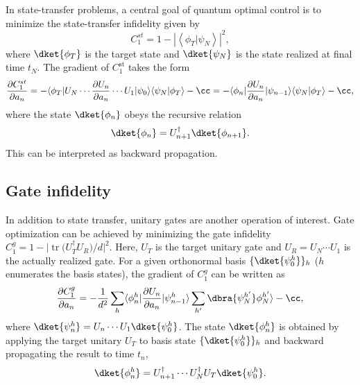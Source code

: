 In state-transfer problems, a central goal of quantum optimal control is to minimize the state-transfer infidelity given by 
\begin{equation}
\label{eq:C1st}
    C_1^{st}=1-\left|\left\langle\phi_T | \psi_{N}\right\rangle\right|^{2},
\end{equation} 
where $\dket{\phi_T}$ is the target state and $\dket{\psi_N}$ is the state realized at final time $t_N$. The gradient of $C_1^{\text{st}}$ takes the form
\begin{equation}
\label{eq:stgradient}
    \frac{\partial C_1^{st} }{\partial a_{ n}}
  =- \langle\phi_T|U_N\cdots \frac {\partial U_{n}}{\partial a_{n}}\cdots U_1|\psi_0\rangle\langle\psi_N|\phi_T\rangle -\cc
=-\langle\phi_{n}|\frac {\partial U_n }{\partial a_{n}}|\psi_{n-1}\rangle\langle\psi_N|\phi_T\rangle - \cc ,
\end{equation}
where the state $\dket{\phi_{n}}$ obeys the recursive relation
\begin{equation}
\label{eq:backward_prop}
    \dket{\phi_{n}}=U_{n+1}^\dagger\dket{\phi_{n+1}}.
\end{equation}
This can be interpreted as backward propagation.

\subsection{Gate infidelity}

In addition to state transfer, unitary gates are another operation of interest. Gate optimization can be achieved by minimizing the gate infidelity $C_1^{g}=1-\big|\operatorname{tr}\big(U_T^{\dagger} U_R\big)/d\big|^2$. Here, $U_T$ is the target unitary gate and $U_R=U_N\cdots U_1$ is the actually realized gate. For a given orthonormal basis $\{\dket{\psi^h_0}\}_h$ ($h$ enumerates the basis states), the gradient of $C_1^{ g}$ can be written as 
\begin{equation} 
\begin{aligned}
\label{eq:gategradient}
  \frac{\partial C_1^{ g} }{\partial a_{ n}}
  &=-\frac{1}{d^2}\sum_{h}\langle\phi_n^h|\frac {\partial  U_n}{\partial a_{n}}|\psi^h_{n-1}\rangle \sum_{h'}\dbra{\psi_N^{h'}}\phi_N^{h'}\rangle
  -\cc,\\
\end{aligned}
\end{equation}
where $\dket{\psi_{n}^h}=U_n\cdots U_1\dket{\psi_0^h}$. The state $\dket{\phi_{n}^h}$ is obtained by applying the target unitary $U_T$ to basis state $\{\dket{\psi^h_0}\}_h$ and backward propagating the result to time $t_n$,
\begin{equation}
\label{eq:gate_backward}
\dket{\phi_{n}^h}=U_{n+1}^\dagger \cdots U_{N}^\dagger U_T\dket{\psi_0^h}.
\end{equation}

